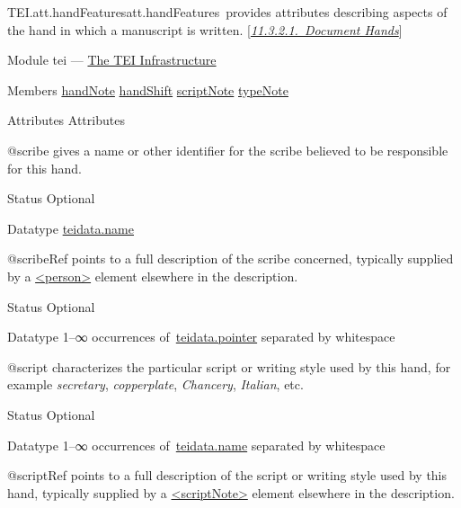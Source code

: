 \begin{reflist}
\item[]\begin{specHead}{TEI.att.handFeatures}{att.handFeatures} provides attributes describing aspects of the hand in which a manuscript is written. [\textit{\hyperref[PHDH]{11.3.2.1.\ Document Hands}}]\end{specHead} 
    \item[{Module}]
  tei — \hyperref[ST]{The TEI Infrastructure}
    \item[{Members}]
  \hyperref[TEI.handNote]{handNote} \hyperref[TEI.handShift]{handShift} \hyperref[TEI.scriptNote]{scriptNote} \hyperref[TEI.typeNote]{typeNote}
    \item[{Attributes}]
  Attributes\hfil\\[-10pt]\begin{sansreflist}
    \item[@scribe]
  gives a name or other identifier for the scribe believed to be responsible for this hand.
\begin{reflist}
    \item[{Status}]
  Optional
    \item[{Datatype}]
  \hyperref[TEI.teidata.name]{teidata.name}
\end{reflist}  
    \item[@scribeRef]
  points to a full description of the scribe concerned, typically supplied by a \hyperref[TEI.person]{<person>} element elsewhere in the description.
\begin{reflist}
    \item[{Status}]
  Optional
    \item[{Datatype}]
  1–∞ occurrences of \hyperref[TEI.teidata.pointer]{teidata.pointer} separated by whitespace
\end{reflist}  
    \item[@script]
  characterizes the particular script or writing style used by this hand, for example \textit{secretary}, \textit{copperplate}, \textit{Chancery}, \textit{Italian}, etc.
\begin{reflist}
    \item[{Status}]
  Optional
    \item[{Datatype}]
  1–∞ occurrences of \hyperref[TEI.teidata.name]{teidata.name} separated by whitespace
\end{reflist}  
    \item[@scriptRef]
  points to a full description of the script or writing style used by this hand, typically supplied by a \hyperref[TEI.scriptNote]{<scriptNote>} element elsewhere in the description.

\end{sansreflist}
\end{reflist}
